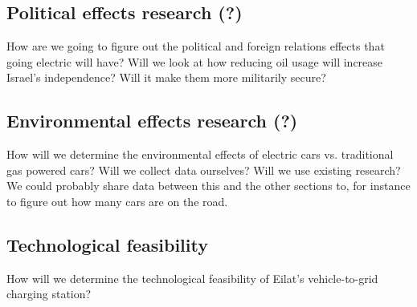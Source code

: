 \documentclass{article}                         %
\begin{document}
\cite{Zhu2015DistributedGrid}

\subsection{Political effects research (?)}
How are we going to figure out the political and foreign relations effects that going electric will have? Will we look at how reducing oil usage will increase Israel's independence? Will it make them more militarily secure?

\subsection{Environmental effects research (?)}
How will we determine the environmental effects of electric cars vs. traditional gas powered cars? Will we collect data ourselves? Will we use existing research? We could probably share data between this and the other sections to, for instance to figure out how many cars are on the road.

\subsection{Technological feasibility}
How will we determine the technological feasibility of Eilat's vehicle-to-grid charging station?

\newpage


\end{document}
